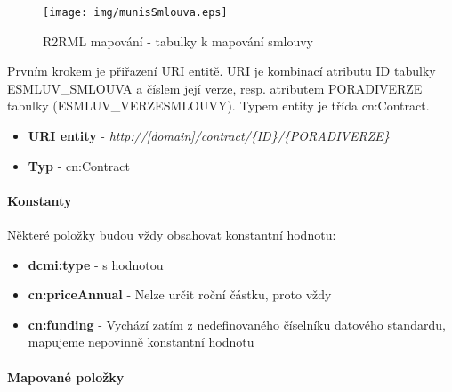 \begin{figure}[H]
\centerline{\texttt{[image: img/munisSmlouva.eps]}}
\caption{R2RML mapování - tabulky k mapování smlouvy}
\label{obr:munisSmlouva}
\end{figure}

Prvním krokem je přiřazení URI entitě. URI je kombinací atributu ID tabulky ESMLUV\_SMLOUVA a číslem její verze, resp. atributem PORADIVERZE tabulky (ESMLUV\_VERZESMLOUVY). Typem entity je třída cn:Contract.

\begin{itemize}
\item \textbf{URI entity} - \textit{http://[domain]/contract/\{ID\}/\{PORADIVERZE\}}
\item \textbf{Typ} - cn:Contract
\end{itemize}

\paragraph*{Konstanty}

Některé položky budou vždy obsahovat konstantní hodnotu:

\begin{itemize}
\item \textbf{dcmi:type} - s hodnotou 
\item \textbf{cn:priceAnnual} - Nelze určit roční částku, proto vždy 
\item \textbf{cn:funding} - Vychází zatím z nedefinovaného číselníku datového standardu, mapujeme nepovinně konstantní hodnotu 
\end{itemize}

\paragraph*{Mapované položky}

